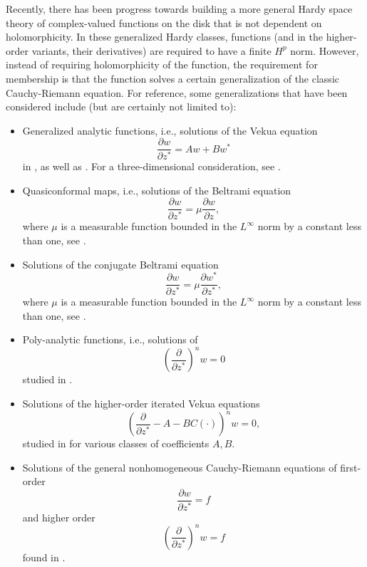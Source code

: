 \documentclass[suppldata]{interact}
\theoremstyle{plain}%
\theoremstyle{definition}
\theoremstyle{remark}
\newcommand{\p}{\partial}
\begin{document}
Recently, there has been progress towards building a more general Hardy space theory of complex-valued functions on the disk that is not dependent on holomorphicity. In these generalized Hardy classes, functions (and in the higher-order variants, their derivatives) are required to have a finite $H^p$ norm. However, instead of requiring holomorphicity of the function, the requirement for membership is that the function solves a certain generalization of the classic Cauchy-Riemann equation. For reference, some generalizations that have been considered include (but are certainly not limited to): 
\begin{itemize}
        \item Generalized analytic functions, i.e., solutions of the Vekua equation
        \[
            \frac{\p w}{\p z^*} = Aw + Bw^*
        \]
        in \cite{KlimBook}, as well as \cite{ PozHardy, CompOp, moreVekHardy, conjbel}. For a three-dimensional consideration, see \cite{threedvek}.
        \item Quasiconformal maps, i.e., solutions of the Beltrami equation
        \[
            \frac{\p w}{\p z^*} = \mu \frac{\p w}{\p z},
        \]
        where $\mu$ is a measurable function bounded in the $L^\infty$ norm by a constant less than one, see \cite{KlimBook, quasiHardy, quasiHardy2, quasiHardy3}.
        \item Solutions of the conjugate Beltrami equation
        \[
            \frac{\p w}{\p z^*} = \mu \frac{\p w^*}{\p z^*},
        \]
        where $\mu$ is a measurable function bounded in the $L^\infty$ norm by a constant less than one, see \cite{PozHardy, CompOp, moreVekHardy, conjbel}.
        \item Poly-analytic functions, i.e., solutions of 
        \[
            \left(\frac{\p}{\p z^*}\right)^n w = 0
        \]
        studied in \cite{polyhardy}.
        \item Solutions of the higher-order iterated Vekua equations
        \[
            \left(\frac{\p}{\p z^*} - A - B C(\cdot)\right)^n w = 0,
        \]
         studied in \cite{metahardy, WB3, WBD} for various classes of coefficients $A,B$.
         \item Solutions of the general nonhomogeneous Cauchy-Riemann equations of first-order
         \[
            \frac{\p w}{\p z^*} = f
         \]
         and higher order
         \[
            \left(\frac{\p }{\p z^*}\right)^n w = f
         \]
         found in \cite{WB}.
\end{itemize}
\end{document}
